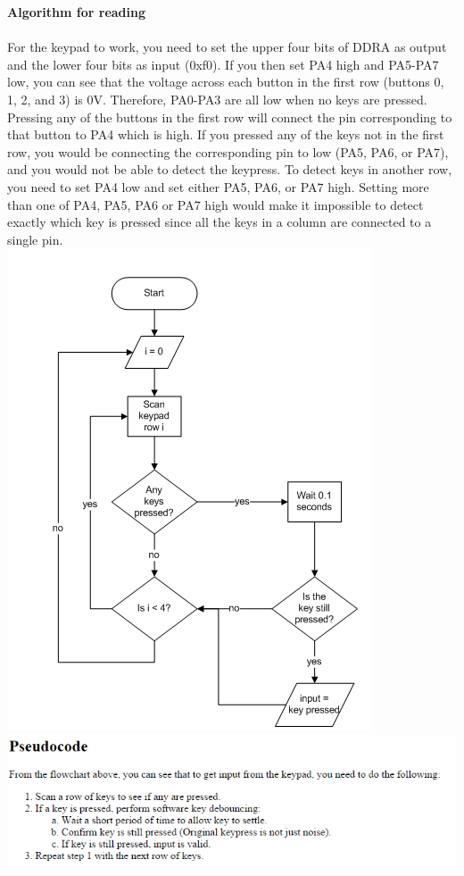 \documentclass[11pt]{article}
\begin{document}
		\textbf{ \large Algorithm for reading }\\\\
		For the keypad to work, you need to set the upper four bits of DDRA as output and the lower four bits as input (0xf0). If you then set PA4 high and PA5-PA7 low, you can see that the voltage across each button in the first row (buttons 0, 1, 2, and 3) is 0V. Therefore, PA0-PA3 are all low when no keys are pressed. Pressing any of the buttons in the first row will connect the pin corresponding to that button to PA4 which is high. If you pressed any of the keys not in the first row, you would be connecting the corresponding pin to low (PA5, PA6, or PA7), and you would not be able to detect the keypress. To detect keys in another row, you need to set PA4 low and set either PA5, PA6, or PA7 high. Setting more than one of PA4, PA5, PA6 or PA7 high would make it impossible to detect exactly which key is pressed since all the keys in a column are connected to a single pin.\\
		\includegraphics[scale=1]{fig_flowchart.png}\\
		\includegraphics[scale=1]{fig_psuedocode.png}\\
\end{document}
